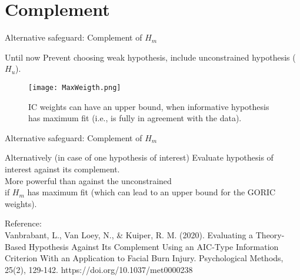 \documentclass[10pt]{beamer}\usepackage[]{graphicx}\usepackage[]{xcolor}
\begin{document}
\section{Complement}
%
%
\begin{frame}{Alternative safeguard: Complement of $H_m$}%
	\begin{block}{Until now}
		Prevent choosing weak hypothesis, include unconstrained hypothesis ($H_u$).
	\end{block}
	
	\begin{figure}
		\centering
		\texttt{[image: MaxWeigth.png]}\\
		\caption{IC weights can have an upper bound, when informative hypothesis has maximum fit (i.e., is fully in agreement with the data).}
	\end{figure}
\end{frame}
%
\begin{frame}{Alternative safeguard: Complement of $H_m$}%
	
	\begin{block}{Alternatively (in case of one hypothesis of interest)}
		Evaluate hypothesis of interest against its complement.\\
		\vspace{\baselineskip}
		More powerful than against the unconstrained \\
		if $H_m$ has maximum fit (which can lead to an upper bound for the GORIC weights).
	\end{block}
	
	\vspace{\baselineskip}
	
	\footnotesize{
		Reference:\\
		Vanbrabant, L., Van Loey, N., \& Kuiper, R. M. (2020). Evaluating a Theory-Based Hypothesis Against Its Complement Using an AIC-Type Information Criterion With an Application to Facial Burn Injury. Psychological Methods, 25(2), 129-142. https://doi.org/10.1037/met0000238
	}
\end{frame}
%
\end{document}
